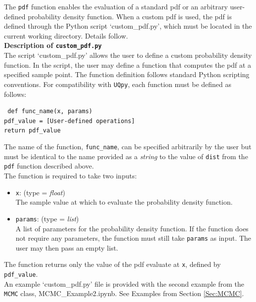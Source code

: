 \noindent The \texttt{pdf} function enables the evaluation of a standard pdf or an arbitrary user-defined probability density function. When a custom pdf is used, the pdf is defined through the Python script `custom\_pdf.py', which must be located in the current working directory. Details follow.\\

\noindent\textbf{Description of \texttt{custom\_pdf.py}}\\

\noindent The script `custom\_pdf.py' allows the user to define a custom probability density function. In the script, the user may define a function that computes the pdf at a specified sample point. The function definition follows standard Python scripting conventions. For compatibility with \texttt{UQpy}, each function must be defined as follows:

\vspace{4mm}
\texttt{{\color{blue} def} func\_name(x, params)}\\
\hspace*{1.3cm} \texttt{pdf\_value = [User-defined operations]}\\
\hspace*{1.3cm} \texttt{return pdf\_value}
\vspace{4mm}

\noindent The name of the function, \texttt{func\_name}, can be specified arbitrarily by the user but must be identical to the name provided as a {\it string} to the value of \texttt{dist} from the \texttt{pdf} function described above.\\

\noindent The function is required to take two inputs: 
\begin{itemize}
\item \texttt{x}: (type = {\it float})\\ 
	The sample value at which to evaluate the probability density function.
\item \texttt{params}: (type = {\it list})\\
	A list of parameters for the probability density function. If the function does not require any parameters, the function must still take \texttt{params} as input. The user may then pass an 	empty list.
\end{itemize}

\noindent The function returns only the value of the pdf evaluate at \texttt{x}, defined by \texttt{pdf\_value}.\\

\noindent An example `custom\_pdf.py' file is provided with the second example from the \texttt{MCMC} class, MCMC\_Example2.ipynb. See Examples from Section \ref{Sec:MCMC}.



